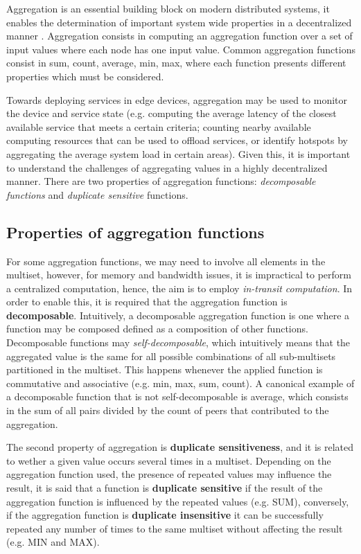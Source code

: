
Aggregation is an essential building block on modern distributed systems, it  enables the determination of important system wide properties in a decentralized manner \cite{DBLP:journals/corr/abs-1110-0725}. Aggregation consists in computing an aggregation function over a set of input values where each node has one input value. Common aggregation functions consist in sum, count, average, min, max, where each function presents different properties which must be considered.

Towards deploying services in edge devices, aggregation may be used to monitor the device and service state (e.g. computing the average latency of the closest available service that meets a certain criteria; counting nearby available computing resources that can be used to offload services, or identify hotspots by aggregating the average system load in certain areas). Given this, it is important to understand the challenges of aggregating values in a highly decentralized manner. There are two properties of aggregation functions: \textit{decomposable functions} and \textit{duplicate sensitive} functions.

\subsection{Properties of aggregation functions}

For some aggregation functions, we may need to involve all elements in the multiset, however, for memory and bandwidth issues, it is impractical to perform a centralized computation, hence, the aim is to employ \textit{in-transit computation}. In order to enable this, it is required that the aggregation function is \textbf{decomposable}. Intuitively, a decomposable aggregation function is one where a function may be composed defined as a composition of other functions. Decomposable functions may \textit{self-decomposable}, which intuitively means that the aggregated value is the same for all possible combinations of all sub-multisets partitioned in the multiset. This happens whenever the applied function is commutative and associative (e.g. min, max, sum, count). A canonical example of a decomposable function that is not self-decomposable is average, which consists in the sum of all pairs divided by the count of peers that contributed to the aggregation.

The second property of aggregation is \textbf{duplicate sensitiveness}, and it is related to wether a given value occurs several times in a multiset. Depending on the aggregation function used, the presence of repeated values may influence the result, it is said that a function is \textbf{duplicate sensitive} if the result of the aggregation function is influenced by the repeated values (e.g. SUM), conversely, if the aggregation function is \textbf{duplicate insensitive} it can be successfully repeated any number of times to the same multiset without affecting the result (e.g. MIN and MAX).


